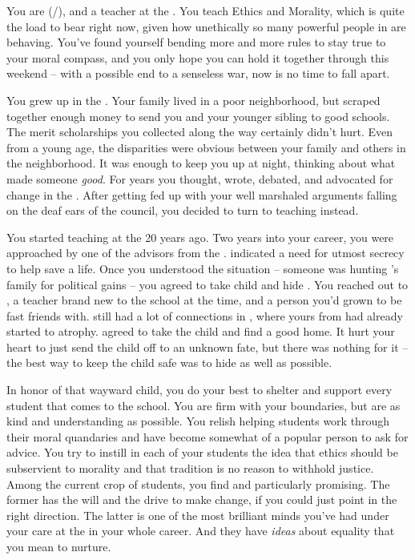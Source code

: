 \documentclass[char]{GL2020}
\begin{document}
\name{\cEthics{}}

You are \cEthics{} (\cEthics{\they}/\cEthics{\them}), and a teacher at the \pSchool{}. You teach Ethics and Morality, which is quite the load to bear right now, given how unethically so many powerful people in \pEarth{} are behaving. You’ve found yourself bending more and more rules to stay true to your moral compass, and you only hope you can hold it together through this weekend -- with a possible end to a senseless war, now is no time to fall apart.

You grew up in the \pTech{}. Your family lived in a poor neighborhood, but scraped together enough money to send you and your younger sibling to good schools. The merit scholarships you collected along the way certainly didn’t hurt. Even from a young age, the disparities were obvious between your family and others in the neighborhood. It was enough to keep you up at night, thinking about what made someone \emph{good}. For years you thought, wrote, debated, and advocated for change in the \pTech{}. After getting fed up with your well marshaled arguments falling on the deaf ears of the council, you decided to turn to teaching instead.

You started teaching at the \pSc{} 20 years ago. Two years into your career, you were approached by one of the advisors from the \pFarm{}. \cEvil{\They} indicated a need for utmost secrecy to help save a life. Once you understood the situation -- someone was hunting \cEvil{}’s family for political gains -- you agreed to take \cEvil{\their} child and hide \cPirateChild{\them}. You reached out to \cPirate{}, a teacher brand new to the school at the time, and a person you’d grown to be fast friends with. \cPirate{\They} still had a lot of connections in \pShip{}, where yours from \pTech{} had already started to atrophy. \cPirate{} agreed to take the child and find \cPirateChild{\them} a good home. It hurt your heart to just send the child off to an unknown fate, but there was nothing for it -- the best way to keep the child safe was to hide \cPirateChild{\them} as well as possible. 

In honor of that wayward child, you do your best to shelter and support every student that comes to the school. You are firm with your boundaries, but are as kind and understanding as possible. You relish helping students work through their moral quandaries and have become somewhat of a popular person to ask for advice. You try to instill in each of your students the idea that ethics should be subservient to morality and that tradition is no reason to withhold justice. Among the current crop of students, you find \cAmbition{} and \cTechStar{} particularly promising. The former has the will and the drive to make change, if you could just point \cAmbition{\them} in the right direction. The latter is one of the most brilliant minds you’ve had under your care at the \pSc{} in your whole career. And they have \emph{ideas} about equality that you mean to nurture.
\end{document}
